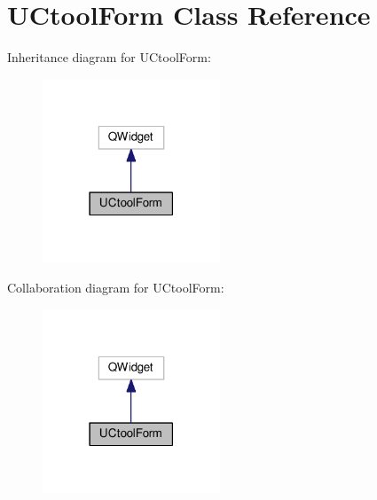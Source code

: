 \hypertarget{class_u_ctool_form}{}\section{U\+Ctool\+Form Class Reference}
\label{class_u_ctool_form}


Inheritance diagram for U\+Ctool\+Form\+:
\nopagebreak
\begin{figure}[H]
\begin{center}
\leavevmode
\includegraphics[width=150pt]{class_u_ctool_form__inherit__graph}
\end{center}
\end{figure}


Collaboration diagram for U\+Ctool\+Form\+:
\nopagebreak
\begin{figure}[H]
\begin{center}
\leavevmode
\includegraphics[width=150pt]{class_u_ctool_form__coll__graph}
\end{center}
\end{figure}
